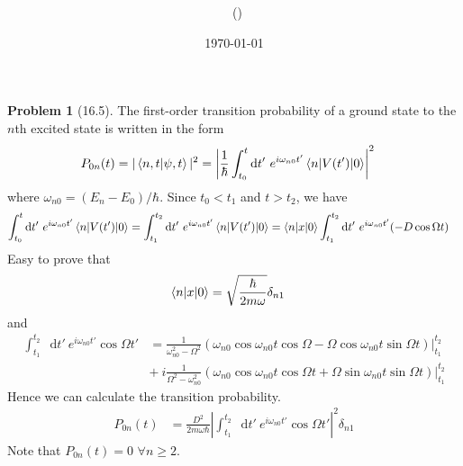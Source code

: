 \documentclass[twoside,11pt]{article}
\title{{\lms \Code \ \Ass}}
\author{\lms \name \ (\href{mailto:\mail}{\mail})}
\date{\sffamily \today}
\makeatletter
\renewcommand*\d{\mathop{}\!\mathrm{d}}
\theoremstyle{definition}
\newtheorem{problem}{Problem}
\theoremstyle{remark}
\newtheorem*{remark}{Remark}
\renewcommand{\maketitle}{\bgroup\setlength{\parindent}{0pt}
\begin{flushleft}
  \textbf{\Large\@title}

  \@author
\end{flushleft}\egroup
}
\makeatother
\begin{document}
\maketitle
\thispagestyle{title}


\begin{problem}[16.5]
The first-order transition probability of a ground state to the $n$th excited state is written in the form
\begin{align*}
    P_{0n}(t) &= |\braket{n, t|\psi, t}|^2
    = \left|
    \frac{1}{\hbar}
    \int_{t_0}^t\d t'\ e^{i\omega_{n0}t'}\braket{n|V(t')|0}
    \right|^2
\end{align*}
where $\omega_{n0} = (E_n - E_0)/\hbar$.
Since $t_0 < t_1$ and $t>t_2$, we have
\begin{align*}
    \int_{t_0}^t\d t'\ e^{i\omega_{n0}t'}\braket{n|V(t')|0}
    &= 
    \int_{t_1}^{t_2}\d t'\ e^{i\omega_{n0}t'}\braket{n|V(t')|0}
    = 
    \braket{n|x|0}
    \int_{t_1}^{t_2}\d t'\ e^{i\omega_{n0}t'}(-D\cos\Omega t)
\end{align*}
Easy to prove that
\begin{align*}
    \braket{n|x|0} &= \sqrt{\frac{\hbar}{2m\omega}}\delta_{n1}
\end{align*}
and
\begin{align*}
    \int_{t_1}^{t_2} \d t'\ e^{i\omega_{n0}t'}\cos\Omega t'
    &= 
    \frac{1}{\omega_{n0}^2 - \Omega^2}(
        \omega_{n0}\cos\omega_{n0}t\cos\Omega - 
        \Omega\cos\omega_{n0}t\sin\Omega t
    )|_{t_1}^{t_2} \\
    &+\ i
    \frac{1}{\Omega^2 - \omega_{n0}^2}(
        \omega_{n0}\cos\omega_{n0}t\cos\Omega t +
        \Omega\sin\omega_{n0}t\sin\Omega t
    )|_{t_1}^{t_2}
\end{align*}
Hence we can calculate the transition probability.
\begin{align*}
    P_{0n}(t) &= \frac{D^2}{2m\omega\hbar}\left|
        \int_{t_1}^{t_2}\d t'\
        e^{i\omega_{n0}t'}\cos\Omega t'
    \right|^2\delta_{n1}
\end{align*}
Note that $P_{0n}(t)=0$ $\forall n \geq 2$.
\end{problem}
\end{document}
